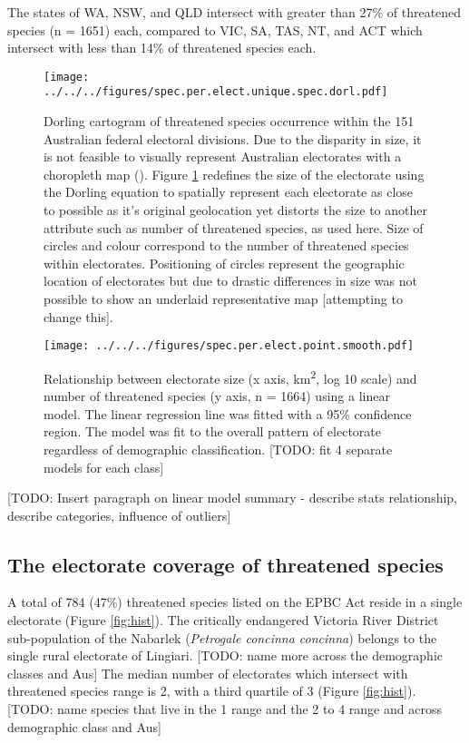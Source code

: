 \documentclass[a4paper,11pt]{article}
\begin{document}
The states of WA, NSW, and QLD intersect with greater than 27\% of threatened species (n = 1651) each, compared to VIC, SA, TAS, NT, and ACT which intersect with less than 14\% of threatened species each.

\begin{figure}[H]
	\centering
    \texttt{[image: ../../../figures/spec.per.elect.unique.spec.dorl.pdf]}
    \caption{Dorling cartogram of threatened species occurrence within the 151 Australian federal electoral divisions. Due to the disparity in size, it is not feasible to visually represent Australian electorates with a choropleth map (\cite{tomasettiMappingAustraliaElectorates2021}). Figure \ref{fig:dorl} redefines the size of the electorate using the Dorling equation to spatially represent each electorate as close to possible as it's original geolocation yet distorts the size to another attribute such as number of threatened species, as used here.
    Size of circles and colour correspond to the number of threatened species within electorates. Positioning of circles represent the geographic location of electorates but due to drastic differences in size was not possible to show an underlaid representative map [attempting to change this].}
    \label{fig:dorl}
\end{figure}

\begin{figure}[H]
	\centering
    \texttt{[image: ../../../figures/spec.per.elect.point.smooth.pdf]}
    \caption{Relationship between electorate size (x axis, km\textsuperscript{2}, log 10 scale) and number of threatened species (y axis, n = 1664) using a linear model. The linear regression line was fitted with a 95\% confidence region. The model was fit to the overall pattern of electorate regardless of demographic classification. [TODO: fit 4 separate models for each class]}
    \label{fig:point_smooth}
\end{figure}

[TODO: Insert paragraph on linear model summary - describe stats relationship, describe categories, influence of outliers]

\subsection{The electorate coverage of threatened species}

A total of 784 (47\%) threatened species listed on the EPBC Act reside in a single electorate (Figure \ref{fig:hist}).
The critically endangered Victoria River District sub-population of the Nabarlek (\emph{Petrogale concinna concinna}) belongs to the single rural electorate of Lingiari.
[TODO: name more across the demographic classes and Aus]
The median number of electorates which intersect with threatened species range is 2, with a third quartile of 3 (Figure \ref{fig:hist}).
[TODO: name species that live in the 1 range and the 2 to 4 range and across demographic class and Aus]
\end{document}
